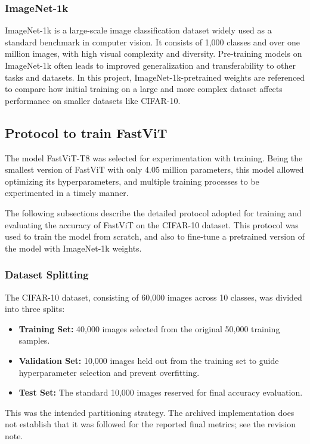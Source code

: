 \documentclass[12pt]{article}
\begin{document}
\subsubsection{ImageNet-1k}
ImageNet-1k is a large-scale image classification dataset widely used as a standard benchmark in computer vision. It consists of 1,000 classes and over one million images, with high visual complexity and diversity. Pre-training models on ImageNet-1k often leads to improved generalization and transferability to other tasks and datasets. In this project, ImageNet-1k-pretrained weights are referenced to compare how initial training on a large and more complex dataset affects performance on smaller datasets like CIFAR-10.

\subsection{Protocol to train FastViT}

The model FastViT-T8 was selected for experimentation with training. Being the smallest version of FastViT with only 4.05 million parameters, this model allowed optimizing its hyperparameters, and multiple training processes to be experimented in a timely manner.

The following subsections describe the detailed protocol adopted for training and evaluating the accuracy of FastViT on the CIFAR-10 dataset. This protocol was used to train the model from scratch, and also to fine-tune a pretrained version of the model with ImageNet-1k weights.

\subsubsection{Dataset Splitting}
The CIFAR-10 dataset, consisting of 60,000 images across 10 classes, was divided into three splits:
\begin{itemize}
    \item \textbf{Training Set:} 40,000 images selected from the original 50,000 training samples.
    \item \textbf{Validation Set:} 10,000 images held out from the training set to guide hyperparameter selection and prevent overfitting.
    \item \textbf{Test Set:} The standard 10,000 images reserved for final accuracy evaluation.
\end{itemize}
This was the intended partitioning strategy. The archived implementation does not establish that it was followed for the reported final metrics; see the revision note.
\end{document}
